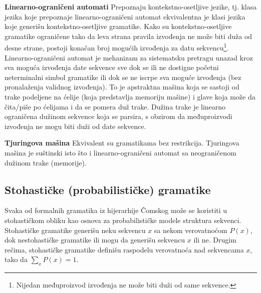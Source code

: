 \documentclass[a4paper, 12pt]{article}
\begin{document}
\vspace*{0.2cm}
\noindent \textbf{Linearno-ograničeni automati} \hspace{0.3cm} Prepoznaju kontekstno-osetljive jezike, tj. klasa jezika koje prepoznaje linearno-ograničeni automat ekvivalentna je klasi jezika koje generišu kontekstno-osetljive gramatike. Kako su kontekstno-osetljive gramatike ograničene tako da leva strana pravila izvođenja ne može biti duža od desne strane, postoji konačan broj mogućih izvođenja za datu sekvencu\footnote{Nijedan međuproizvod izvođenja ne može biti duži od same sekvence.}. Linearno-ograničeni automat je mehanizam za sistematsku pretragu unazad kroz sva moguća izvođenja date sekvence sve dok se ili ne dostigne početni neterminalni simbol gramatike ili dok se ne iscrpe sva moguće izvođenja (bez pronalaženja validnog izvođenja). To je apstraktna mašina koja se sastoji od trake podeljene na ćelije (koja predstavlja memoriju mašine) i glave koja može da čita/piše po ćelijama i da se pomera duž trake. Dužina trake je linearno ograničena dužinom sekvence koja se parsira, s obzirom da međuproizvodi izvođenja ne mogu biti duži od date sekvence.

\vspace*{0.2cm}
\noindent \textbf{Tjuringova mašina} \hspace{0.3cm} Ekvivalent su gramatikama bez restrikcija. Tjuringova mašina je suštinski isto što i linearno-ograničeni automat sa neograničenom dužinom trake (memorije).

\subsection{Stohastičke (probabilističke) gramatike}

Svaka od formalnih gramatika iz hijerarhije Čomskog može se koristiti u stohastičkom obliku kao osnova za probabilističke modele struktura sekvenci. Stohastičke gramatike generišu neku sekvencu $x$ sa nekom verovatnoćom $P(x)$, dok nestohastičke gramatike ili mogu da generišu sekvencu $x$ ili ne. Drugim rečima, stohastičke gramatike definišu raspodelu verovatnoća nad sekvencama $x$, tako da $\sum_x P(x) = 1$.
\end{document}
